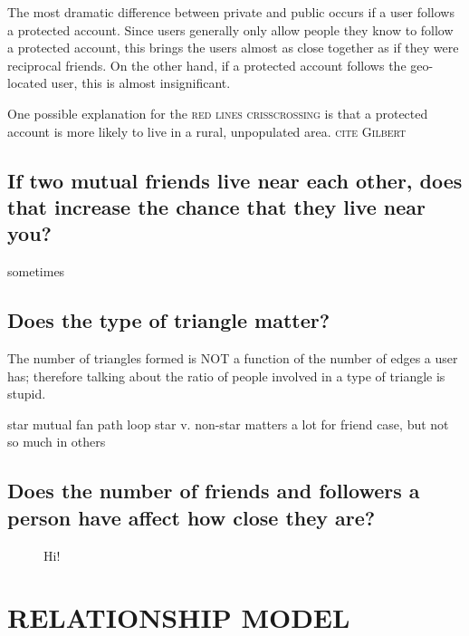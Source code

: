 \documentclass{sig-alternate}
\begin{document}
The most dramatic difference between private and public occurs if a user follows a protected account.
Since users generally only allow people they know to follow a protected account, this brings the users almost as close together as if they were reciprocal friends. On the other hand, if a protected account follows the geo-located user, this is almost insignificant.

One possible explanation for the \textsc{red lines crisscrossing} is that a protected account is more likely to live in a rural, unpopulated area. \textsc{cite Gilbert}

\subsection{If two mutual friends live near each other, does that increase the chance that they live near you?}
sometimes
\begin{figure}
\centering
{}
\caption{
}
\label{fig:NearTriads}
\end{figure}

\subsection{Does the type of triangle matter?}
\begin{figure*}
\centering
{}
\caption{
}
\label{fig:TriadTypes}
\end{figure*}


The number of triangles formed is NOT a function of the number of edges a user has; therefore talking about the ratio of people involved in a type of triangle is stupid.

star
mutual fan
path
loop 
star v. non-star matters a lot for friend case, but not so much in others



\subsection{Does the number of friends and followers a person have affect how close they are?}

\begin{figure*}
\centering
{}
\caption{
Hi!
}
\label{fig:LocalAll}
\end{figure*}

\section{RELATIONSHIP MODEL}
\label{sec:model}
\end{document}
